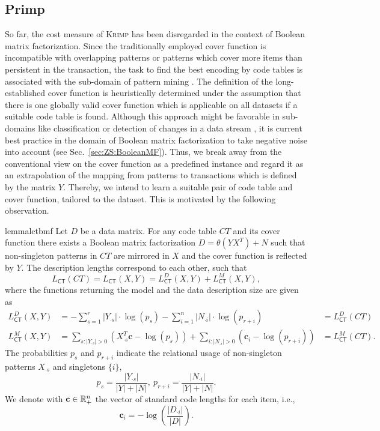 \subsection{Primp}\label{sec:PR:primp}
So far, the cost measure of \textsc{Krimp} has been disregarded in the context of Boolean matrix factorization. Since the traditionally employed cover function is incompatible with overlapping patterns or patterns which cover more items than persistent in the transaction, the task to find the best encoding by code tables is associated with the sub-domain of pattern mining \citep{miettinen2014mdl4bmf,lucchese2014unifying,karaev2015getting}. The definition of the long-established cover function is heuristically determined under the assumption that there is one globally valid cover function which is applicable on all datasets if a suitable code table is found. Although this approach might be favorable in sub-domains like classification or detection of changes in a data stream \citep{vreeken2011krimp,van2008streamkrimp}, it is current best practice in the domain of Boolean matrix factorization to take negative noise into account (see Sec.~\ref{sec:ZS:BooleanMF}).  
Thus, we break away from the conventional view on the cover function as a predefined instance and regard it as an extrapolation of the mapping from patterns to transactions which is defined by the matrix $Y$. Thereby, we intend to learn a suitable pair of code table and cover function, tailored to the dataset. This is motivated by the following observation.
\begin{restatable}{lemma}{lctbmf}\label{thm:CTBMF}
Let $D$ be a data matrix. For any code table $CT$ and its cover function there exists a Boolean matrix factorization $D=\theta(YX^T)+N$ such that non-singleton patterns in $CT$ are mirrored in $X$ and the cover function is reflected by $Y$. The description lengths correspond to each other, such that 
\[L_{\mathsf{CT}}(CT)=L_{\mathsf{CT}}(X,Y)=L_{\mathsf{CT}}^D(X,Y)+L_{\mathsf{CT}}^M(X,Y),\]
where the functions returning the model and the data description size are given as  
\begin{align*}
	L_{\mathsf{CT}}^D(X,Y)&=-\sum_{s=1}^r |Y_{\cdot s}| \cdot \log(p_s)
       -\sum_{i=1}^n |N_{\cdot i}| \cdot \log(p_{r+i})
       &=L^D_{\mathsf{CT}}(CT)\\
    L_{\mathsf{CT}}^M(X,Y)
    &=\sum_{s:|Y_{\cdot s}|> 0}\left(X_{\cdot s}^T\mathbf{c}-\log(p_s)\right)
	+\sum_{i:|N_{\cdot i}|> 0}\left(\mathbf{c}_i-\log(p_{r+i})\right)&=L_{\mathsf{CT}}^M(CT).
\end{align*}
The probabilities $p_s$ and $p_{r+i}$ indicate the relational usage of non-singleton patterns $X_{\cdot s}$ and singletons $\{i\}$,
\[
	p_s = \frac{|Y_{\cdot s}|}{|Y|+|N|},\  p_{r+i} = \frac{|N_{\cdot i}|}{|Y|+|N|}.
\]
We denote with $\mathbf{c}\in\mathbb{R}_+^n$ the vector of standard code lengths for each item, i.e., 
\[\mathbf{c}_i=-\log\left(\frac{|D_{\cdot i}|}{|D|}\right).\]
\end{restatable}
